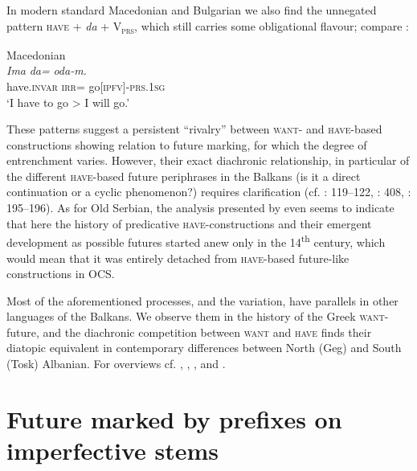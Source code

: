 \documentclass[output=paper,colorlinks,citecolor=brown]{langscibook}
\begin{document}
In modern standard Macedonian and Bulgarian we also find the unnegated pattern \textsc{have} + \textit{da} + V\textsubscript{\textsc{prs}}, which still carries some obligational flavour; compare :

\ea Macedonian \label{ex:wiemer:22}\\
    \gll \textit{Ima} \textit{da=} \textit{oda-m.}\\
         have.\textsc{invar} \textsc{irr=} go[\textsc{ipfv}]-\textsc{prs.1sg}\\
    \glt ‘I have to go > I will go.’
\z

These patterns suggest a persistent “rivalry” between \textsc{want}- and \textsc{have}-based constructions showing relation to future marking, for which the degree of entrenchment varies. However, their exact diachronic relationship, in particular of the different \textsc{have}-based future periphrases in the Balkans (is it a direct continuation or a cyclic phenomenon?) requires clarification (cf. \cite{Xaralampiev1981}: 119--122, \cite{kramer1997negation}: 408, \cite{mitkovska_buzarovska_2014}: 195--196). As for Old Serbian, the analysis presented by \citet[93--97]{Grković-Mejdžor2012} even seems to indicate that here the history of predicative \textsc{have}-constructions and their emergent development as possible futures started anew only in the 14\textsuperscript{th} century, which would mean that it was entirely detached from \textsc{have}-based future-like constructions in OCS.

Most of the aforementioned processes, and the variation, have parallels in other languages of the Balkans. We observe them in the history of the Greek \textsc{want}-future, and the diachronic competition between \textsc{want} and \textsc{have} finds their diatopic equivalent in contemporary differences between North (Geg) and South (Tosk) Albanian. For overviews cf. \citet{kramer1994grammaticalization}, \citet[36--38]{andersen_2006b}, \citet{Tomić2006}, and \citet[51--53]{WiemerLinnemeier2024}.

\section{Future marked by prefixes on imperfective stems}\label{sec:wiemer:4}
\end{document}
